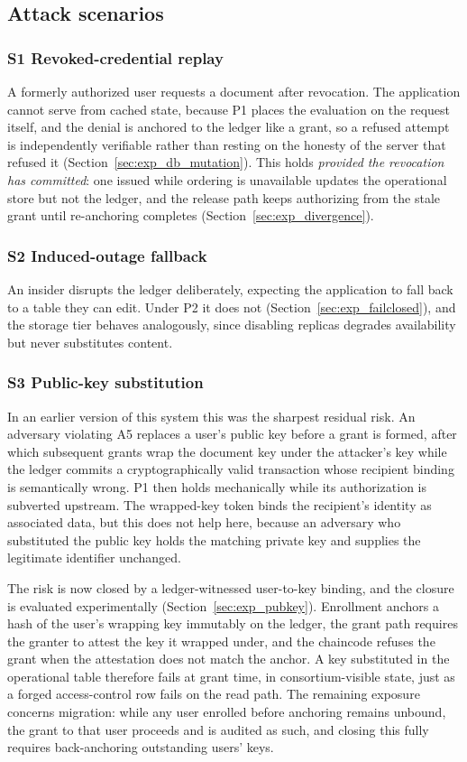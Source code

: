 \documentclass[preprint,12pt]{elsarticle}
\begin{document}
\subsection{Attack scenarios}
\label{sec:scenarios}

\subsubsection{S1 Revoked-credential replay}
A formerly authorized user requests a document after revocation. The application
cannot serve from cached state, because P1 places the evaluation on the request
itself, and the denial is anchored to the ledger like a grant, so a refused
attempt is independently verifiable rather than resting on the honesty of the
server that refused it (Section~\ref{sec:exp_db_mutation}). This holds
\emph{provided the revocation has committed}: one issued while ordering is
unavailable updates the operational store but not the ledger, and the release
path keeps authorizing from the stale grant until re-anchoring completes
(Section~\ref{sec:exp_divergence}).

\subsubsection{S2 Induced-outage fallback}
An insider disrupts the ledger deliberately, expecting the application to
fall back to a table they can edit. Under P2 it does not
(Section~\ref{sec:exp_failclosed}), and the storage tier behaves analogously,
since disabling replicas degrades availability but never substitutes
content.

\subsubsection{S3 Public-key substitution}
\label{sc:s3}
In an earlier version of this system this was the sharpest residual risk. An
adversary violating A5 replaces a user's public key before a grant is formed,
after which subsequent grants wrap the document key under the attacker's key
while the ledger commits a cryptographically valid transaction whose recipient
binding is semantically wrong. P1 then holds mechanically while its
authorization is subverted upstream. The wrapped-key token binds the
recipient's identity as associated data, but this does not help here, because
an adversary who substituted the public key holds the matching private key and
supplies the legitimate identifier unchanged.

The risk is now closed by a ledger-witnessed user-to-key binding, and the
closure is evaluated experimentally (Section~\ref{sec:exp_pubkey}).
Enrollment anchors a hash of the user's wrapping key immutably on the ledger,
the grant path requires the granter to attest the key it wrapped under, and the
chaincode refuses the grant when the attestation does not match the anchor. A
key substituted in the operational table therefore fails at grant time, in
consortium-visible state, just as a forged access-control row fails on the read
path. The remaining exposure concerns migration: while any user enrolled
before anchoring remains unbound, the
grant to that user proceeds and is audited as such, and closing this fully
requires back-anchoring outstanding users' keys.
\end{document}
